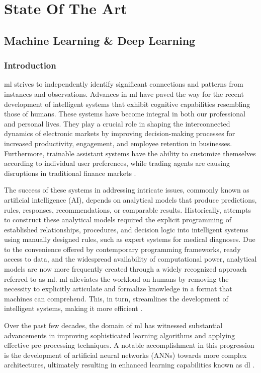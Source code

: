 \chapter{State Of The Art}

\section{Machine Learning \& Deep Learning}
\subsection{Introduction}
\acrfull{ml} strives to independently identify significant connections and patterns from instances and observations. Advances in \acrshort{ml} have paved the way for the recent development of intelligent systems that exhibit cognitive capabilities resembling those of humans. These systems have become integral in both our professional and personal lives. They play a crucial role in shaping the interconnected dynamics of electronic markets by improving decision-making processes for increased productivity, engagement, and employee retention in businesses. Furthermore, trainable assistant systems have the ability to customize themselves according to individual user preferences, while trading agents are causing disruptions in traditional finance markets \cite{janiesch2021machine}.

The success of these systems in addressing intricate issues, commonly known as artificial intelligence (AI), depends on analytical models that produce predictions, rules, responses, recommendations, or comparable results. Historically, attempts to construct these analytical models required the explicit programming of established relationships, procedures, and decision logic into intelligent systems using manually designed rules, such as expert systems for medical diagnoses. Due to the convenience offered by contemporary programming frameworks, ready access to data, and the widespread availability of computational power, analytical models are now more frequently created through a widely recognized approach referred to as \acrshort{ml}. \acrshort{ml} alleviates the workload on humans by removing the necessity to explicitly articulate and formalize knowledge in a format that machines can comprehend. This, in turn, streamlines the development of intelligent systems, making it more efficient \cite{janiesch2021machine}.

Over the past few decades, the domain of \acrshort{ml} has witnessed substantial advancements in improving sophisticated learning algorithms and applying effective pre-processing techniques. A notable accomplishment in this progression is the development of artificial neural networks (ANNs) towards more complex architectures, ultimately resulting in enhanced learning capabilities known as \acrfull{dl} \cite{janiesch2021machine}.



